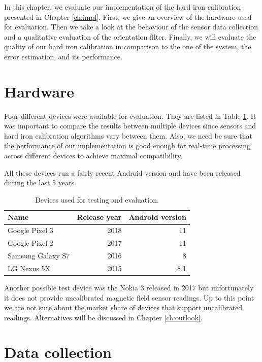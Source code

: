 
In this chapter, we evaluate our implementation of the hard iron calibration presented in Chapter \ref{ch:impl}. First, we give an overview of the hardware used for evaluation. Then we take a look at the behaviour of the sensor data collection and a qualitative evaluation of the orientation filter. Finally, we will evaluate the quality of our hard iron calibration in comparison to the one of the system, the error estimation, and its performance.

\section{Hardware}

Four different devices were available for evaluation. They are listed in Table \ref{tbl:hardware}. It was important to compare the results between multiple devices since sensors and hard iron calibration algorithms vary between them. Also, we need be sure that the performance of our implementation is good enough for real-time processing across different devices to achieve maximal compatibility.

All these devices run a fairly recent Android version and have been released during the last 5 years.

\begin{table}[h]
    \centering
    \begin{tabular}{ | l | r | r | }
    \hline
    \textbf{Name}     & \textbf{Release year} & \textbf{Android version} \\ \hline
    Google Pixel 3    & 2018 & 11 \\ \hline
    Google Pixel 2    & 2017 & 11 \\ \hline
    Samsung Galaxy S7 & 2016 & 8 \\ \hline
    LG Nexus 5X       & 2015 & 8.1 \\ \hline
    \end{tabular}
    \caption{Devices used for testing and evaluation.}
    \label{tbl:hardware}
\end{table}

Another possible test device was the Nokia 3 released in 2017 but unfortunately it does not provide uncalibrated magnetic field sensor readings. Up to this point we are not sure about the market share of devices that support uncalibrated readings. Alternatives will be discussed in Chapter \ref{ch:outlook}.

\section{Data collection}
\label{sec:eval_sensor}

